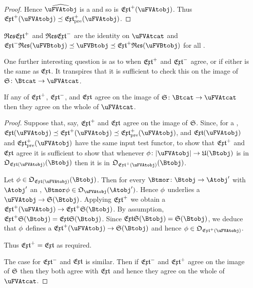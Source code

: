 \documentclass[%
12pt,%
arxiv,%
defaults
]{myclass}
\begin{document}
\begin{proof}
Hence \(\widehat{\uFVAtobj}\) is a \uFVBtobj and so is \(\Jextfunc(\uFVAtobj)\).
Thus \(\Jextfunc(\uFVAtobj) \preceq \PJextfunc(\uFVAtobj)\).
\end{proof}

\begin{corollary}
\(\resfunc \Jextfunc\) and \(\resfunc \Mextfunc\) are the identity on \(\uFVAtcat\) and \(\Mextfunc \resfunc(\uFVBtobj) \preceq \uFVBtobj \preceq \Jextfunc \resfunc(\uFVBtobj)\) for all \uFVBtobjalts[\uFVBtobj].
 \noproof
\end{corollary}

One further interesting question is as to when \(\Jextfunc\) and \(\Mextfunc\) agree, or if either is the same as \(\extfunc\).
It transpires that it is sufficient to check this on the image of \(\sfunc \colon \Btcat \to \uFVAtcat\).

\begin{proposition}
If any of \(\Jextfunc\), \(\Mextfunc\), and \(\extfunc\) agree on the image of \(\sfunc \colon \Btcat \to \uFVAtcat\) then they agree on the whole of \(\uFVAtcat\).
\end{proposition}

\begin{proof}
Suppose that, say, \(\Jextfunc\) and \(\extfunc\) agree on the image of \(\sfunc\).
Since, for a \uFVAtobj[\uFVAtobj], \(\extfunc(\uFVAtobj) \preceq \Jextfunc(\uFVAtobj) \preceq \PJextfunc(\uFVAtobj)\), and \(\extfunc(\uFVAtobj)\) and \(\PJextfunc(\uFVAtobj)\) have the same input test functor, to show that \(\Jextfunc\) and \(\extfunc\) agree it is sufficient to show that whenever \(\ofn \colon \forfunc[\uFVAtobj] \to \ufunc(\Btobj)\) is in \(\otest_{\extfunc(\uFVAtobj)}(\Btobj)\) then it is in \(\otest_{\Jextfunc(\uFVAtobj)}(\Btobj)\).

Let \(\ofn \in \otest_{\extfunc(\uFVAtobj)}(\Btobj)\).
Then for every \(\Btmor \colon \Btobj \to \Atobj'\) with \(\Atobj'\) an \Atobjalt, \(\Btmor \ofn \in \otest_{\uFVAtobj}(\Atobj')\).
Hence \(\phi\) underlies a \uVAtmor \(\uFVAtobj \to \sfunc(\Btobj)\).
Applying \(\Jextfunc\) we obtain a \uVBtmor \(\Jextfunc(\uFVAtobj) \to \Jextfunc \sfunc(\Btobj)\).
By assumption, \(\Jextfunc \sfunc(\Btobj) = \extfunc \sfunc(\Btobj)\).
Since \(\extfunc \sfunc(\Btobj) = \sfunc(\Btobj)\), we deduce that \(\phi\) defines a \uVBtmor \(\Jextfunc(\uFVAtobj) \to \sfunc(\Btobj)\) and hence \(\ofn \in \otest_{\Jextfunc(\uFVAtobj)}\).

Thus \(\Jextfunc = \extfunc\) as required.

The case for \(\Mextfunc\) and \(\extfunc\) is similar.
Then if \(\Mextfunc\) and \(\Jextfunc\) agree on the image of \(\sfunc\) then they both agree with \(\extfunc\) and hence they agree on the whole of \(\uFVAtcat\).
\end{proof}
\end{document}
